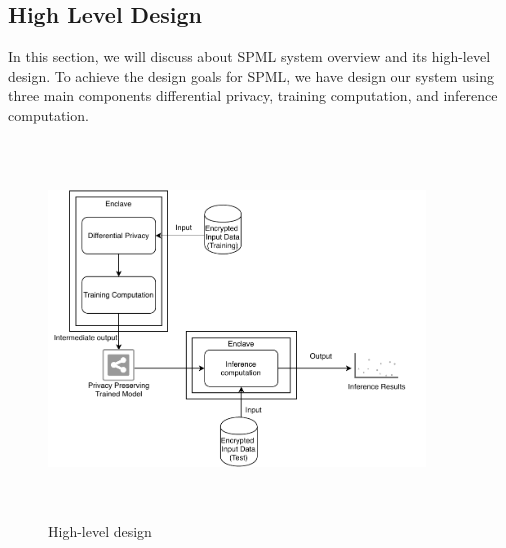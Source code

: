 \subsection{High Level Design}
In this section, we will discuss about SPML system overview and its high-level design. To achieve the design goals for SPML, we have design our system using three main components differential privacy, training computation, and inference computation.
\begin{figure}
    \centering
    \includegraphics[width=10cm, height=10cm]{images/HLD.pdf}
    \caption{ High-level design}
    \label{fig:hld}
\end{figure}

